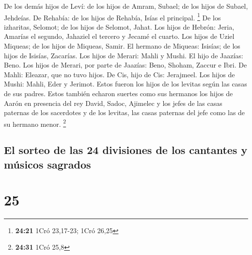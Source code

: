  De los demás hijos de Leví: de los hijos de Amram,
Subael; de los hijos de Subael, Jehdeías.  De Rehabía: de
los hijos de Rehabía, Isías el principal. \footnote{\textbf{24:21} 1Cró
  23,17-23; 1Cró 26,25}  De los izharitas, Selomot; de
los hijos de Selomot, Jahat.  Los hijos de Hebrón: Jeria,
Amarías el segundo, Jahaziel el tercero y Jecamé el cuarto.
 Los hijos de Uziel Miqueas; de los hijos de Miqueas,
Samir.  El hermano de Miqueas: Isisías; de los hijos de
Isisías, Zacarías.  Los hijos de Merari: Mahli y Mushi.
El hijo de Jaazías: Beno.  Los hijos de Merari, por parte
de Jaazías: Beno, Shoham, Zaccur e Ibri.  De Mahli:
Eleazar, que no tuvo hijos.  De Cis, hijo de Cis:
Jerajmeel.  Los hijos de Mushi: Mahli, Eder y Jerimot.
Estos fueron los hijos de los levitas según las casas de sus padres.
 Estos también echaron suertes como sus hermanos los
hijos de Aarón en presencia del rey David, Sadoc, Ajimelec y los jefes
de las casas paternas de los sacerdotes y de los levitas, las casas
paternas del jefe como las de su hermano menor. \footnote{\textbf{24:31}
  1Cró 25,8}

\hypertarget{el-sorteo-de-las-24-divisiones-de-los-cantantes-y-muxfasicos-sagrados}{%
\subsection{El sorteo de las 24 divisiones de los cantantes y músicos
sagrados}\label{el-sorteo-de-las-24-divisiones-de-los-cantantes-y-muxfasicos-sagrados}}

\hypertarget{section-24}{%
\section{25}\label{section-24}}

